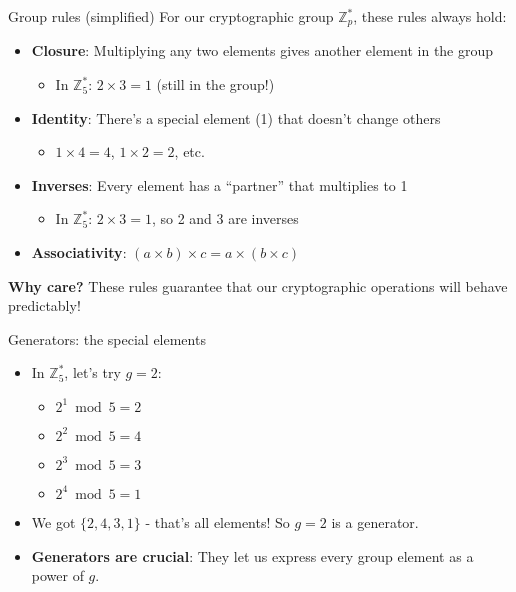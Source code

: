 \documentclass[aspectratio=169, lualatex, handout]{beamer}
\begin{document}
\begin{frame}{Group rules (simplified)}
	For our cryptographic group $\mathbb{Z}_p^*$, these rules always hold:
	\begin{itemize}[<+->]
		\item \textbf{Closure}: Multiplying any two elements gives another element in the group
		      \begin{itemize}
			      \item In $\mathbb{Z}_5^*$: $2 \times 3 = 1$ (still in the group!)
		      \end{itemize}
		\item \textbf{Identity}: There's a special element (1) that doesn't change others
		      \begin{itemize}
			      \item $1 \times 4 = 4$, $1 \times 2 = 2$, etc.
		      \end{itemize}
		\item \textbf{Inverses}: Every element has a ``partner'' that multiplies to 1
		      \begin{itemize}
			      \item In $\mathbb{Z}_5^*$: $2 \times 3 = 1$, so 2 and 3 are inverses
		      \end{itemize}
		\item \textbf{Associativity}: $(a \times b) \times c = a \times (b \times c)$
	\end{itemize}
	\vspace{0.5cm}
	\textbf{Why care?} These rules guarantee that our cryptographic operations will behave predictably!
\end{frame}

\begin{frame}{Generators: the special elements}
	\begin{itemize}[<+->]
		\item In $\mathbb{Z}_5^*$, let's try $g = 2$:
		      \begin{itemize}
			      \item $2^1 \bmod 5 = 2$
			      \item $2^2 \bmod 5 = 4$
			      \item $2^3 \bmod 5 = 3$
			      \item $2^4 \bmod 5 = 1$
		      \end{itemize}
		\item We got $\{2, 4, 3, 1\}$ - that's all elements! So $g = 2$ is a generator.
		\item \textbf{Generators are crucial}: They let us express every group element as a power of $g$.
	\end{itemize}
\end{frame}
\end{document}
